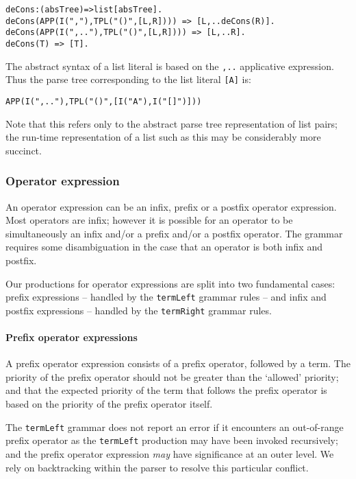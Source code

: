 \begin{verbatim}
deCons:(absTree)=>list[absTree].
deCons(APP(I(","),TPL("()",[L,R]))) => [L,..deCons(R)].
deCons(APP(I(",.."),TPL("()",[L,R]))) => [L,..R].
deCons(T) => [T].
\end{verbatim}
     
The abstract syntax of a list literal is based on the \verb+,..+ applicative expression. Thus the parse tree corresponding to the list literal \verb+[A]+ is:
\begin{verbatim}
APP(I(",.."),TPL("()",[I("A"),I("[]")]))
\end{verbatim}
Note that this refers only to the abstract parse tree representation of list pairs; the run-time representation of a list such as this may be considerably more succinct.

\subsubsection{Operator expression}
\label{grammar:operator-expression}
An operator expression can be an infix, prefix or a postfix operator expression. Most operators are infix; however it is possible for an operator to be simultaneously an infix and/or a prefix and/or a postfix operator. The grammar requires some disambiguation in the case that an operator is both infix and postfix.
     
Our productions for operator expressions are split into two fundamental cases: prefix expressions -- handled by the \verb+termLeft+ grammar rules -- and infix and postfix expressions -- handled by the \verb+termRight+ grammar rules.

\paragraph{Prefix operator expressions}
A prefix operator expression consists of a prefix operator, followed by a term. The priority of the prefix operator should not be greater than the `allowed' priority; and that the expected priority of the term that follows the prefix operator is based on the priority of the prefix operator itself.
	
The \verb+termLeft+ grammar does not report an error if it encounters an out-of-range prefix operator as the \verb+termLeft+ production may have been invoked recursively; and the prefix operator expression \emph{may} have significance at an outer level. We rely on backtracking within the parser to resolve this particular conflict.

